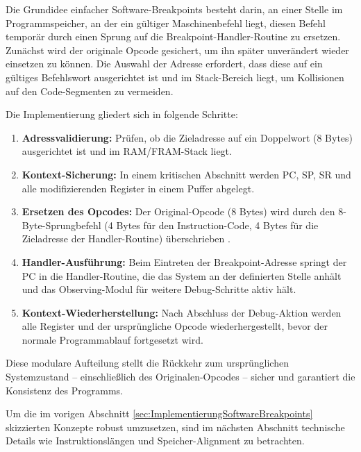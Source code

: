 Die Grundidee einfacher Software-Breakpoints besteht darin, an einer Stelle im Programmspeicher, an der ein g\"ultiger Maschinenbefehl  liegt, diesen Befehl tempor\"ar durch einen Sprung auf die Breakpoint-Handler-Routine zu ersetzen. Zun\"achst wird der originale Opcode gesichert, um ihn sp\"ater unver\"andert wieder einsetzen zu k\"onnen. Die Auswahl der Adresse erfordert, dass diese auf ein g\"ultiges Befehlswort ausgerichtet ist und im Stack-Bereich liegt, um Kollisionen auf den Code-Segmenten zu vermeiden.

Die Implementierung gliedert sich in folgende Schritte:
\begin{enumerate}
\item \textbf{Adressvalidierung:} Pr\"ufen, ob die Zieladresse auf ein Doppelwort (8 Bytes) ausgerichtet ist und im RAM/FRAM-Stack liegt.  
\item \textbf{Kontext-Sicherung:} In einem kritischen Abschnitt werden PC, SP, SR und alle modifizierenden Register in einem Puffer abgelegt.  
\item \textbf{Ersetzen des Opcodes:} Der Original-Opcode (8 Bytes) wird durch den 8-Byte-Sprungbefehl (4 Bytes f\"ur den Instruction-Code, 4 Bytes f\"ur die Zieladresse der Handler-Routine) \"uberschrieben .  
\item \textbf{Handler-Ausf\"uhrung:} Beim Eintreten der Breakpoint-Adresse springt der PC in die Handler-Routine, die das System an der definierten Stelle anh\"alt und das Observing-Modul f\"ur weitere Debug-Schritte aktiv h\"alt.
\item \textbf{Kontext-Wiederherstellung:} Nach Abschluss der Debug-Aktion werden alle Register und der urspr\"ungliche Opcode wiederhergestellt, bevor der normale Programmablauf fortgesetzt wird.
\end{enumerate}

Diese modulare Aufteilung stellt die R\"uckkehr zum urspr\"unglichen Systemzustand – einschlie{\ss}lich des Originalen-Opcodes – sicher und garantiert die Konsistenz des Programms.

Um die im vorigen Abschnitt \ref{sec:ImplementierungSoftwareBreakpoints} skizzierten Konzepte robust umzusetzen, sind im n\"achsten Abschnitt technische Details wie Instruktionsl\"angen und Speicher-Alignment zu betrachten.

